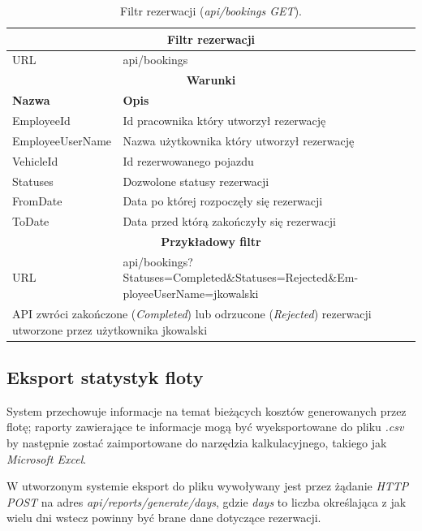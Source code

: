 \documentclass[eng,printmode,openany]{mgr}
\begin{document}
	\begin{table}[H]
		\caption{Filtr rezerwacji (\textit{api/bookings GET}).}
		\begin{tabularx}{\textwidth}{|l|X|}
			\hline                                       							
			\multicolumn{2}{|c|}{\textbf{Filtr rezerwacji}}							        		\\ \hline
			URL                 & api/bookings     							             			\\ \hline
			\multicolumn{2}{|c|}{\textbf{Warunki}}     												\\ \hline
			\textbf{Nazwa}      & \textbf{Opis}              										\\ \hline
			EmployeeId        	& Id pracownika który utworzył rezerwację 						    \\ \hline
			EmployeeUserName	& Nazwa użytkownika który utworzył rezerwację						\\ \hline	
			VehicleId	        & Id rezerwowanego pojazdu       									\\ \hline
			Statuses        	& Dozwolone statusy rezerwacji         							    \\ \hline
			FromDate       		& Data po której rozpoczęły się rezerwacji						    \\ \hline
			ToDate 			    & Data przed którą zakończyły się rezerwacji						\\ \hline											
			\multicolumn{2}{|c|}{\textbf{Przykładowy filtr}}										\\ \hline
			URL                 & api/bookings?Statuses=Completed\&Statuses=Rejected\&Em-ployeeUserName=jkowalski \\ \hline
			\multicolumn{2}{|X|}{API zwróci zakończone (\textit{Completed}) lub odrzucone (\textit{Rejected}) rezerwacji utworzone przez użytkownika jkowalski}	\\ \hline
		\end{tabularx}
	\end{table}
	
	\newpage
	\subsection{Eksport statystyk floty}
	System przechowuje informacje na temat bieżących kosztów generowanych przez flotę; raporty zawierające te informacje mogą być wyeksportowane do pliku \textit{.csv} by następnie zostać zaimportowane do narzędzia kalkulacyjnego, takiego jak \textit{Microsoft Excel}.
	
	W utworzonym systemie eksport do pliku wywoływany jest przez żądanie \textit{HTTP POST} na adres \textit{api/reports/generate/days}, gdzie \textit{days} to liczba określająca z jak wielu dni wstecz powinny być brane dane dotyczące rezerwacji.
	
\end{document}
